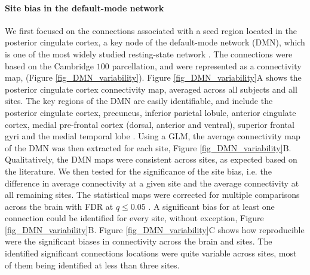 \documentclass[authoryear]{elsarticle}
\begin{document}
\paragraph{Site bias in the default-mode network} We first focused on the
connections associated with a seed region located in the posterior cingulate cortex, a key
node of the default-mode network (DMN), which is one of the most widely studied
resting-state network \citep{Greicius2004}. The connections were based on the
Cambridge $100$ parcellation, and were represented as a connectivity map, (Figure
\ref{fig_DMN_variability}). Figure \ref{fig_DMN_variability}A shows the posterior cingulate cortex
connectivity map, averaged across all subjects and all sites. The key regions of
the DMN are easily identifiable, and include the posterior cingulate cortex, precuneus, inferior
parietal lobule, anterior cingulate cortex, medial pre-frontal cortex (dorsal,
anterior and ventral), superior frontal gyri and the medial temporal lobe
\citep{Damoiseaux2006,Dansereau2014,Yan2013a}. Using a GLM, the average
connectivity map of the DMN was then extracted for each site, Figure
\ref{fig_DMN_variability}B. Qualitatively, the DMN maps were consistent across
sites, as expected based on the literature. We then tested for the significance
of the site bias, i.e. the difference in average connectivity at a given site
and the average connectivity at all remaining sites. The statistical maps were
corrected for multiple comparisons across the brain with FDR at $q\leq 0.05$
\citep{Benjamini1995}. A significant bias for at least one connection could be
identified for every site, without exception, Figure
\ref{fig_DMN_variability}B. Figure \ref{fig_DMN_variability}C shows how
reproducible were the significant biases in connectivity across the brain and
sites. The identified significant connections locations were quite variable across sites, most of them being
identified at less than three sites.
\end{document}
